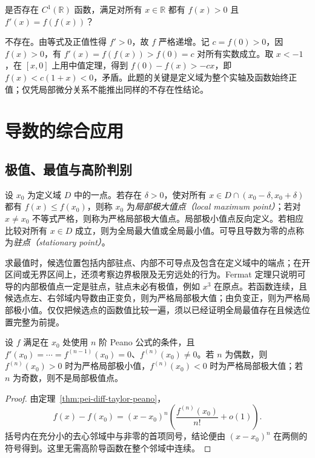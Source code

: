\begin{example}
\label{ex:pei-diff-positive-composition}
是否存在 $C^1(\mathbb R)$ 函数，满足对所有 $x\in\mathbb R$ 都有 $f(x)>0$ 且 $f'(x)=f(f(x))$？
\end{example}
\begin{solve}
不存在。由等式及正值性得 $f'>0$，故 $f$ 严格递增。记 $c=f(0)>0$，因 $f(x)>0$，有 $f'(x)=f(f(x))>f(0)=c$ 对所有实数成立。取 $x<-1$，在 $[x,0]$ 上用中值定理，得到
$f(0)-f(x)>-cx$，即 $f(x)<c(1+x)<0$，矛盾。此题的关键是定义域为整个实轴及函数始终正值；仅凭局部微分关系不能推出同样的不存在性结论。
\end{solve}

\section{导数的综合应用}
\label{sec:pei-diff-derivative-applications}

\subsection{极值、最值与高阶判别}

\begin{definition}
设 $x_0$ 为定义域 $D$ 中的一点。若存在 $\delta>0$，使对所有 $x\in D\cap(x_0-\delta,x_0+\delta)$ 都有 $f(x)\le f(x_0)$，则称 $x_0$ 为\emph{局部极大值点（local maximum point）}；若对 $x\ne x_0$ 不等式严格，则称为严格局部极大值点。局部极小值点反向定义。若相应比较对所有 $x\in D$ 成立，则为全局最大值或全局最小值。可导且导数为零的点称为\emph{驻点（stationary point）}。
\end{definition}

求最值时，候选位置包括内部驻点、内部不可导点及包含在定义域中的端点；在开区间或无界区间上，还须考察边界极限及无穷远处的行为。Fermat 定理只说明可导的内部极值点一定是驻点，驻点未必有极值，例如 $x^3$ 在原点。若函数连续，且候选点左、右邻域内导数由正变负，则为严格局部极大值；由负变正，则为严格局部极小值。仅仅把候选点的函数值比较一遍，须以已经证明全局最值存在且候选位置完整为前提。

\begin{proposition}[首个非零高阶导数判别]
\label{prop:pei-diff-higher-extremum}
设 $f$ 满足在 $x_0$ 处使用 $n$ 阶 Peano 公式的条件，且
$f'(x_0)=\cdots=f^{(n-1)}(x_0)=0$、$f^{(n)}(x_0)\ne0$。若 $n$ 为偶数，则 $f^{(n)}(x_0)>0$ 时为严格局部极小值，$f^{(n)}(x_0)<0$ 时为严格局部极大值；若 $n$ 为奇数，则不是局部极值点。
\end{proposition}
\begin{proof}
由定理~\ref{thm:pei-diff-taylor-peano}，
\[
 f(x)-f(x_0)=(x-x_0)^n
 \left(\frac{f^{(n)}(x_0)}{n!}+o(1)\right).
\]
括号内在充分小的去心邻域中与非零的首项同号，结论便由 $(x-x_0)^n$ 在两侧的符号得到。这里无需高阶导函数在整个邻域中连续。
\end{proof}

